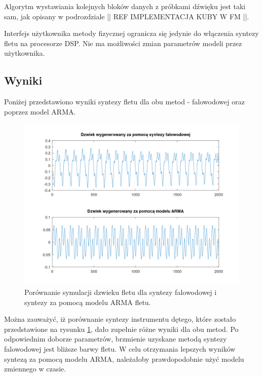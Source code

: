 Algorytm wystawiania kolejnych bloków danych z próbkami dźwięku jest taki sam, jak opisany w podrozdziale || REF IMPLEMENTACJA KUBY W FM ||.

Interfejs użytkownika metody fizycznej ogranicza się jedynie do włączenia syntezy fletu na procesorze DSP. Nie ma możliwości zmian parametrów modeli przez użytkownika.

\subsection{Wyniki}
Poniżej przedstawiono wyniki syntezy fletu dla obu metod - falowodowej oraz poprzez model ARMA.

\begin{figure}[H]
	\centering
	\includegraphics[width=12cm]{grafiki/flute_porownanie_syntez_symulacja}
	\captionsetup{justification=centering}
	\caption{Porównanie symulacji dzwieku fletu dla syntezy falowodowej i syntezy za pomocą modelu ARMA fletu.}
	\label{rys:por_synt_flet}
\end{figure}

Można zauważyć, iż porównanie syntezy instrumentu dętego, które zostało przedstawione na rysunku \ref{rys:por_synt_flet}, dało zupełnie różne wyniki dla obu metod. Po odpowiednim doborze parametrów, brzmienie uzyskane metodą syntezy falowodowej jest bliższe barwy fletu. W celu otrzymania lepszych wyników syntezą za pomocą modelu ARMA, należałoby prawdopodobnie użyć modelu zmiennego w czasie.
